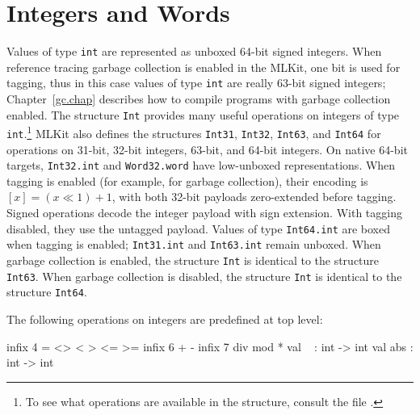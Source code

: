 \documentclass[12pt]{book}
\begin{document}
\section{Integers and Words}
\label{integers.sec}

Values of type
%
%
\lstinline{int} are represented as unboxed 64-bit signed integers. When reference
tracing garbage collection is enabled in the MLKit, one bit is used for tagging,
thus in this case values of type \lstinline{int} are really 63-bit signed integers;
Chapter~\ref{gc.chap} describes how to compile programs with garbage collection
enabled. The structure \lstinline{Int} provides many useful operations on integers of
type \lstinline{int}.\footnote{To see what operations are available in the 
structure, consult the file .}  MLKit also defines
the structures
%
%
\lstinline{Int31},
%
%
\lstinline{Int32},
%
%
\lstinline{Int63}, and
%
%
\lstinline{Int64} for operations on 31-bit, 32-bit integers, 63-bit, and 64-bit
integers. On native 64-bit targets, \lstinline{Int32.int} and
\lstinline{Word32.word} have low-unboxed representations. When tagging is
enabled (for example, for garbage collection), their encoding is
$[x] = (x \ll 1) + 1$, with both 32-bit payloads zero-extended before tagging. Signed operations
decode the integer payload with sign extension. With tagging disabled,
they use the untagged payload. Values of type \lstinline{Int64.int} are boxed
when tagging is enabled; \lstinline{Int31.int} and \lstinline{Int63.int}
remain unboxed. When
garbage collection is enabled, the structure \lstinline{Int} is identical to the
structure \lstinline{Int63}. When garbage collection is disabled, the structure \lstinline{Int} is identical to the structure \lstinline{Int64}.

The following operations on integers are predefined at top level:
%
%
%
%
%
%
%
%
%
%
%
%
%
%
\begin{smlcode}
  infix   4 = <> < > <= >=
  infix   6 + -
  infix   7 div mod  *
  val ~   : int -> int
  val abs : int -> int
\end{smlcode}
\end{document}
